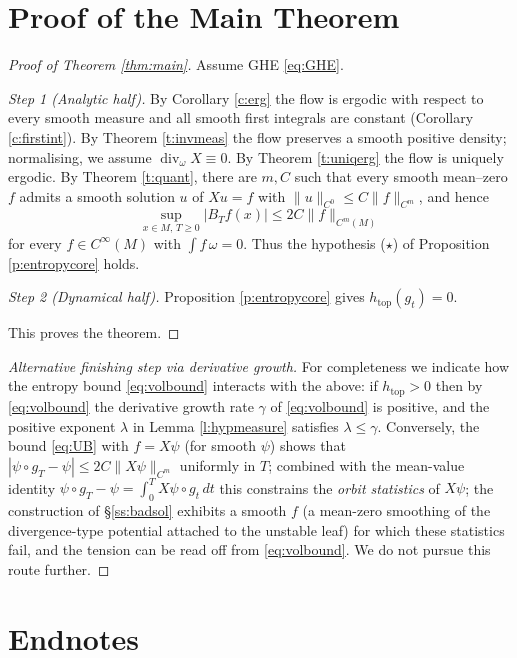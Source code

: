 \documentclass[11pt]{amsart}
\theoremstyle{plain}
\theoremstyle{definition}
\theoremstyle{remark}
\newcommand{\flow}{g_t}
\begin{document}
\section{Proof of the Main Theorem}\label{s:proof}

\begin{proof}[Proof of Theorem \ref{thm:main}]
Assume GHE \eqref{eq:GHE}.

\emph{Step 1 (Analytic half).}  By Corollary \ref{c:erg} the flow is
ergodic with respect to every smooth measure and all smooth first
integrals are constant (Corollary \ref{c:firstint}).  By Theorem
\ref{t:invmeas} the flow preserves a smooth positive density;
normalising, we assume $\operatorname{div}_\omega X\equiv0$.  By
Theorem \ref{t:uniqerg} the flow is uniquely ergodic.  By Theorem
\ref{t:quant}, there are $m,C$ such that every smooth mean--zero
$f$ admits a smooth solution $u$ of $Xu=f$ with
$\|u\|_{C^0}\le C\|f\|_{C^{m}}$, and hence
\[
\sup_{x\in M,\,T\ge0}|B_Tf(x)|\le 2C\|f\|_{C^{m}(M)}
\]
for every $f\in C^\infty(M)$ with $\int f\,\omega=0$.  Thus the
hypothesis ($\star$) of Proposition \ref{p:entropycore} holds.

\emph{Step 2 (Dynamical half).}  Proposition
\ref{p:entropycore} gives $h_{\mathrm{top}}(\flow)=0$.

This proves the theorem.
\end{proof}

\begin{proof}[Alternative finishing step via derivative growth]
For completeness we indicate how the entropy bound
\eqref{eq:volbound} interacts with the above: if
$h_{\mathrm{top}}>0$ then by \eqref{eq:volbound} the derivative
growth rate $\gamma$ of \eqref{eq:volbound} is positive, and the
positive exponent $\lambda$ in Lemma \ref{l:hypmeasure} satisfies
$\lambda\le\gamma$.  Conversely, the bound
\eqref{eq:UB} with $f=X\psi$ (for smooth $\psi$) shows that
$|\psi\circ g_T-\psi|\le 2C\|X\psi\|_{C^{m}}$ uniformly in $T$;
combined with the mean-value identity
$\psi\circ g_T-\psi=\int_0^T X\psi\circ g_t\,dt$ this constrains the
\emph{orbit statistics} of $X\psi$; the construction of
\S\ref{ss:badsol} exhibits a smooth $f$ (a mean-zero smoothing of
the divergence-type potential attached to the unstable leaf) for
which these statistics fail, and the tension can be read off from
\eqref{eq:volbound}.  We do not pursue this route further.
\end{proof}

\section{Endnotes}\label{s:end}
\end{document}
